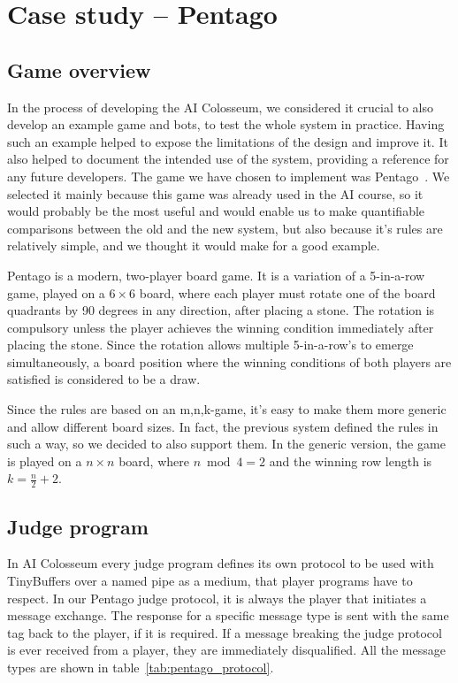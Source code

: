 \chapter{Case study -- Pentago}
\label{chap:pentago}

\section{Game overview}

In the process of developing the AI Colosseum, we considered it crucial to also
develop an example game and bots, to test the whole system in practice. Having
such an example helped to expose the limitations of the design and improve it.
It also helped to document the intended use of the system, providing a
reference for any future developers. The game we have chosen to implement was
Pentago~\cite{pentago}. We selected it mainly because this game was already used in the AI
course, so it would probably be the most useful and would enable us to make
quantifiable comparisons between the old and the new system, but also because
it's rules are relatively simple, and we thought it would make for a good
example.

Pentago is a modern, two-player board game. It is a variation of a 5-in-a-row
game, played on a $6 \times 6$ board, where each player must rotate one of the
board quadrants by 90 degrees in any direction, after placing a stone. The
rotation is compulsory unless the player achieves the winning condition
immediately after placing the stone. Since the rotation allows multiple
5-in-a-row's to emerge simultaneously, a board position where the winning
conditions of both players are satisfied is considered to be a draw.

Since the rules are based on an m,n,k-game, it's easy to make them more generic
and allow different board sizes. In fact, the previous system defined the rules
in such a way, so we decided to also support them. In the generic version, the
game is played on a $n \times n$ board, where $n \bmod 4 = 2$ and the winning
row length is $k = \frac{n}{2} + 2$.

\section{Judge program}

In AI Colosseum every judge program defines its own protocol to be used with
TinyBuffers over a named pipe as a medium, that player programs have to respect.
In our Pentago judge protocol, it is always the player that initiates a message
exchange. The response for a specific message type is sent with the same tag
back to the player, if it is required. If a message breaking the judge protocol
is ever received from a player, they are immediately disqualified. All the
message types are shown in table~\ref{tab:pentago_protocol}.

